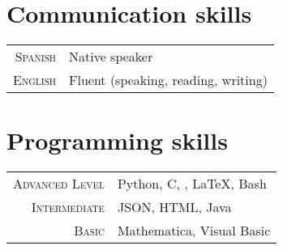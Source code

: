 \documentclass{my_cv}
\begin{document}
\begin{multicols}{2}	
\section{Communication skills}
\begin{tabular}{@{}r|l}
	\textsc{Spanish} & Native speaker \\
	\textsc{English} & Fluent (speaking, reading, writing) \\
\end{tabular}
\section{Programming skills}
\begin{tabular}{@{}r|p{5cm}}
	\textsc{Advanced Level} & Python, C, \faGit, \LaTeX, Bash \\
	\textsc{Intermediate} & JSON, HTML, Java \\
	\textsc{Basic} & Mathematica, Visual Basic \\
\end{tabular}
\end{multicols}
	
\end{document}
